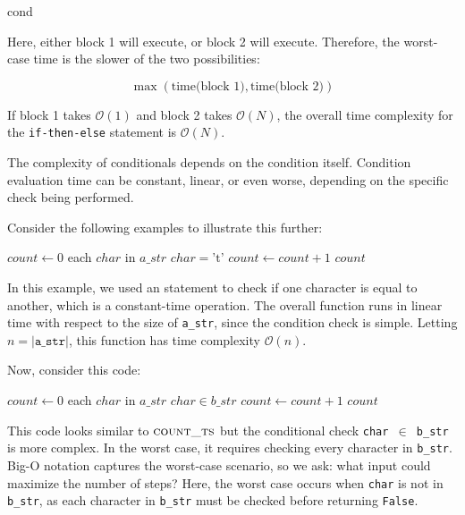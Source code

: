 \begin{codebox}
    \li \If cond \Then
    \li     {}
    \li \Else
    \li     {}
    \li \End
\end{codebox}


Here, either block 1 will execute, or block 2 will execute. Therefore, the worst-case time is the slower of the two possibilities:

\[
\max (\text{time(block 1)}, \text{time(block 2)})
\]

If block 1 takes $\mathcal{O}(1)$ and block 2 takes $\mathcal{O}(N)$, the overall time complexity for the \texttt{if-then-else} statement is $\mathcal{O}(N)$.

The complexity of conditionals depends on the condition itself. Condition evaluation time can be constant, linear, or even worse, depending on the specific check being performed.

Consider the following examples to illustrate this further:

\begin{codebox}
    \li $count \gets 0$
    \li \For each $char$ in $a\_str$ \Do
    \li     \If $char = \text{'t'}$ \Then
    \li         $count \gets count + 1$
            \End
        \End
    \li \Return $count$
\end{codebox}


In this example, we used an \texttt{\If} statement to check if one character is equal to another, which is a constant-time operation. The overall function runs in linear time with respect to the size of \texttt{a\_str}, since the condition check is simple. Letting $n = |\texttt{a\_str}|$, this function has time complexity $\mathcal{O}(n)$.

Now, consider this code:

\begin{codebox}
    \li $count \gets 0$
    \li \For each $char$ in $a\_str$ \Do
    \li     \If $char \in b\_str$ \Then
    \li         $count \gets count + 1$
            \End
        \End
    \li \Return $count$
\end{codebox}

This code looks similar to $\proc{count\_ts}$ but the conditional check \texttt{char $\in$ b\_str} is more complex. In the worst case, it requires checking every character in \texttt{b\_str}. Big-O notation captures the worst-case scenario, so we ask: what input could maximize the number of steps? Here, the worst case occurs when \texttt{char} is not in \texttt{b\_str}, as each character in \texttt{b\_str} must be checked before returning \texttt{False}.

